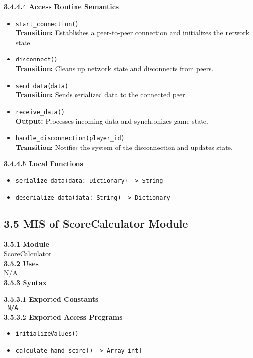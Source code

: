 \documentclass[12pt, titlepage]{article}
\begin{document}
\textbf{3.4.4.4 Access Routine Semantics}
\begin{itemize}
    \item \texttt{start\_connection()}\\
    \textbf{Transition:} Establishes a peer-to-peer connection and initializes the network state.

    \item \texttt{disconnect()}\\
    \textbf{Transition:} Cleans up network state and disconnects from peers.

    \item \texttt{send\_data(data)}\\
    \textbf{Transition:} Sends serialized data to the connected peer.

    \item \texttt{receive\_data()}\\
    \textbf{Output:} Processes incoming data and synchronizes game state.

    \item \texttt{handle\_disconnection(player\_id)}\\
    \textbf{Transition:} Notifies the system of the disconnection and updates state.
\end{itemize}

\textbf{3.4.4.5 Local Functions}
\begin{itemize}
    \item \texttt{serialize\_data(data: Dictionary) -> String}
    \item \texttt{deserialize\_data(data: String) -> Dictionary}
\end{itemize}


\subsection*{3.5 MIS of ScoreCalculator Module}
\textbf{3.5.1 Module}\\
 ScoreCalculator\\

\noindent \textbf{3.5.2 Uses}\\
N/A \\

\noindent \textbf{3.5.3 Syntax}

\noindent \textbf{3.5.3.1 Exported Constants}\\

\texttt{ N/A}\\

\textbf{3.5.3.2 Exported Access Programs}
\begin{itemize}
	\item \texttt{initializeValues()}
	\item \texttt{calculate\_hand\_score() -> Array[int]}
	
\end{itemize}
\end{document}
